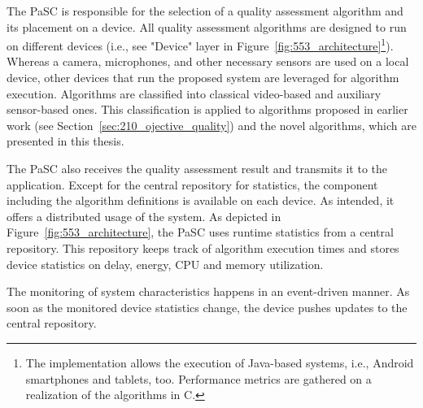 The \ac{PaSC} is responsible for the selection of a quality assessment algorithm and its placement on a device.
All quality assessment algorithms are designed to run on different devices (i.e., see "Device" layer in Figure~\ref{fig:553_architecture}\footnote{The implementation allows the execution of Java-based systems, i.e., Android smartphones and tablets, too. Performance metrics are gathered on a realization of the algorithms in C.}).
Whereas a camera, microphones, and other necessary sensors are used on a local device, other devices that run the proposed system are leveraged for algorithm execution. Algorithms are classified into classical video-based and auxiliary sensor-based ones. This classification is applied to algorithms proposed in earlier work (see Section~\ref{sec:210_ojective_quality}) and the novel algorithms, which are presented in this thesis.

The \ac{PaSC} also receives the quality assessment result and transmits it to the application. 
Except for the central repository for statistics, the component including the algorithm definitions is available on each device. 
As intended, it offers a distributed usage of the system. 
As depicted in Figure~\ref{fig:553_architecture}, the \ac{PaSC} uses runtime statistics from a central repository.
This repository keeps track of algorithm execution times and stores device statistics on delay, energy, \ac{CPU} and memory utilization.

The monitoring of system characteristics happens in an event-driven manner. 
As soon as the monitored device statistics change, the device pushes updates to the central repository.